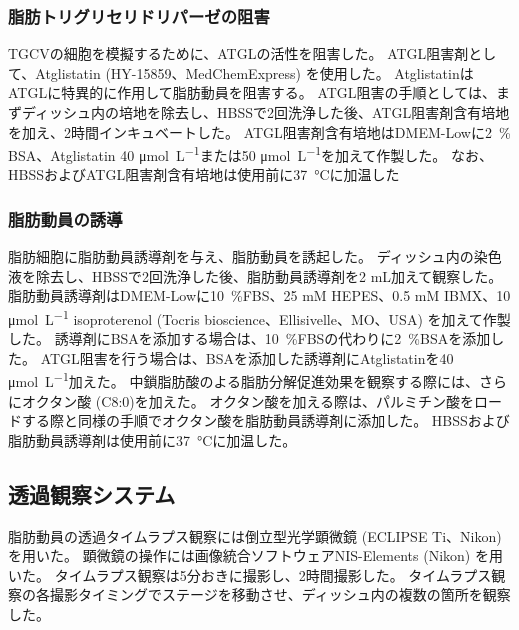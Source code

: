 \documentclass[uplatex,a4paper]{jsarticle}
\begin{document}
\subsubsection{脂肪トリグリセリドリパーゼの阻害}
TGCVの細胞を模擬するために、ATGLの活性を阻害した。
ATGL阻害剤として、Atglistatin (HY-15859、MedChemExpress) を使用した。
AtglistatinはATGLに特異的に作用して脂肪動員を阻害する\cite{Mayer2013}。
ATGL阻害の手順としては、まずディッシュ内の培地を除去し、HBSSで2回洗浄した後、ATGL阻害剤含有培地を加え、2時間インキュベートした。
ATGL阻害剤含有培地はDMEM-Lowに\SI{2}{\percent} BSA、Atglistatin 40 \si{\micro\mol\per\L}または50 \si{\micro\mol\per\L}を加えて作製した。
なお、HBSSおよびATGL阻害剤含有培地は使用前に\SI{37}{\degreeCelsius}に加温した

\subsubsection{脂肪動員の誘導}
脂肪細胞に脂肪動員誘導剤を与え、脂肪動員を誘起した。
ディッシュ内の染色液を除去し、HBSSで2回洗浄した後、脂肪動員誘導剤を2 mL加えて観察した。
脂肪動員誘導剤はDMEM-Lowに\SI{10}{\percent}FBS、25 mM HEPES、0.5 mM IBMX、10 \si{\micro\mol\per\L} isoproterenol (Tocris bioscience、Ellisivelle、MO、USA) を加えて作製した\cite{Hashimoto2012}。
誘導剤にBSAを添加する場合は、\SI{10}{\percent}FBSの代わりに\SI{2}{\percent}BSAを添加した\cite{Hashimoto2012}。
ATGL阻害を行う場合は、BSAを添加した誘導剤にAtglistatinを40 \si{\micro\mol\per\L}加えた。
中鎖脂肪酸のよる脂肪分解促進効果を観察する際には、さらにオクタン酸 (C8:0)を加えた。
オクタン酸を加える際は、パルミチン酸をロードする際と同様の手順でオクタン酸を脂肪動員誘導剤に添加した。
HBSSおよび脂肪動員誘導剤は使用前に\SI{37}{\degreeCelsius}に加温した。

\subsection{透過観察システム}
脂肪動員の透過タイムラプス観察には倒立型光学顕微鏡 (ECLIPSE Ti、Nikon) を用いた。
顕微鏡の操作には画像統合ソフトウェアNIS-Elements (Nikon) を用いた。
タイムラプス観察は5分おきに撮影し、2時間撮影した。
タイムラプス観察の各撮影タイミングでステージを移動させ、ディッシュ内の複数の箇所を観察した。
\end{document}

